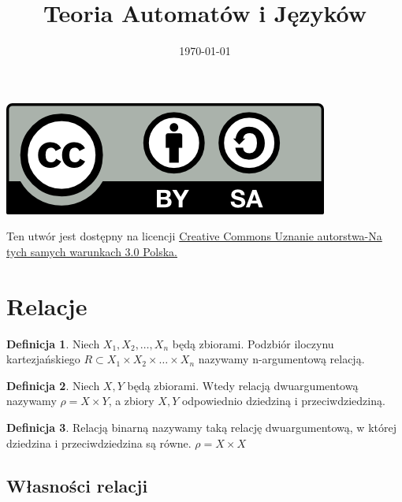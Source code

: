 \documentclass[12pt,a4paper]{article}
\theoremstyle{definition}
\newtheorem{df}{Definicja}
\begin{document}
\title{ Teoria Automatów i Języków}
\author{\vspace{-5ex}}
\date{\today}
\maketitle
\tableofcontents

\begin{center}
\leavevmode

\vfill

\includegraphics[width=1 in]{by-sa.png}
\end{center}
\label{fig:cc}
\scriptsize{Ten utwór jest dostępny na licencji  
\href{http://creativecommons.org/licenses/by-sa/3.0/pl/}{Creative Commons Uznanie autorstwa-Na tych samych warunkach 3.0 Polska.}}

\pagebreak

\section{Relacje}

\begin{df}
Niech $X_1, X_2, \dots, X_n$ będą zbiorami. Podzbiór iloczynu kartezjańskiego $R \subset X_1 \times X_2 \times \dots \times X_n$ 
nazywamy n-argumentową relacją. 
\end{df}

\begin{df}
Niech $X, Y$ będą zbiorami. Wtedy relacją dwuargumentową nazywamy $\rho = X \times Y$, a zbiory $X, Y$ odpowiednio dziedziną i przeciwdziedziną.  
\end{df}

\begin{df}
Relacją binarną nazywamy taką relację dwuargumentową, w której dziedzina i przeciwdziedzina są równe. $\rho = X \times X$
\end{df}

\subsection{Własności relacji}
\end{document}
